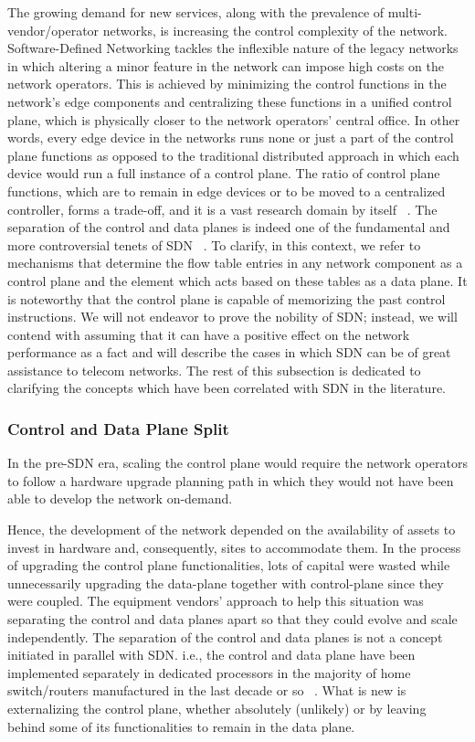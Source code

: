 The growing demand for new services, along with the prevalence of multi-vendor/operator networks, is increasing the control complexity of the network. Software-Defined Networking tackles the inflexible nature of the legacy networks in which altering a minor feature in the network can impose high costs on the network operators. This is achieved by minimizing the control functions in the network's edge components and centralizing these functions in a unified control plane, which is physically closer to the network operators' central office. In other words, every edge device in the networks runs none or just a part of the control plane functions as opposed to the traditional distributed approach in which each device would run a full instance of a control plane. The ratio of control plane functions, which are to remain in edge devices or to be moved to a centralized controller, forms a trade-off, and it is a vast research domain by itself ~\cite{Levin:2012:LCS:2342441.2342443,6461198,7218382,7367345}. The separation of the control and data planes is indeed one of the fundamental and more controversial tenets of \ac{SDN} ~\cite{D.:2013:SSD:2566940}. To clarify, in this context, we refer to mechanisms that determine the flow table entries in any network component as a control plane and the element which acts based on these tables as a data plane. It is noteworthy that the control plane is capable of memorizing the past control instructions.
We will not endeavor to prove the nobility of SDN; instead, we will contend with assuming that it can have a positive effect on the network performance as a fact and will describe the cases in which \ac{SDN} can be of great assistance to telecom networks.
The rest of this subsection is dedicated to clarifying the concepts which have been correlated with \ac{SDN} in the literature.

\subsubsection{Control and Data Plane Split}

In the pre-\ac{SDN} era, scaling the control plane would require the network operators to follow a hardware upgrade planning path in which they would not have been able to develop the network on-demand. 

Hence, the development of the network depended on the availability of assets to invest in hardware and, consequently, sites to accommodate them. In the process of upgrading the control plane functionalities, lots of capital were wasted while unnecessarily upgrading the data-plane together with control-plane since they were coupled. The equipment vendors' approach to help this situation was separating the control and data planes apart so that they could evolve and scale independently. The separation of the control and data planes is not a concept initiated in parallel with SDN. i.e., the control and data plane have been implemented separately in dedicated processors in the majority of home switch/routers manufactured in the last decade or so ~\cite{D.:2013:SSD:2566940}. What is new is externalizing the control plane, whether absolutely (unlikely) or by leaving behind some of its functionalities to remain in the data plane.

